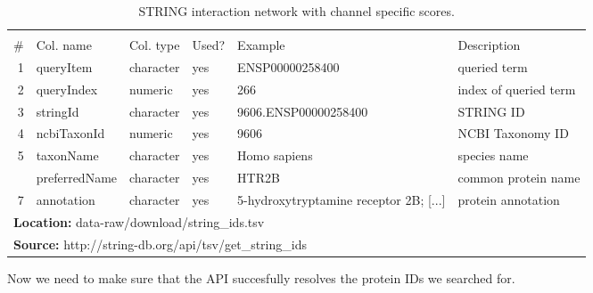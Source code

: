 \begin{table}[H]

\caption{\label{tab:string_ids}STRING interaction network with channel specific scores.}
\begin{tabular}[t]{rlllll}
\toprule
\multicolumn{6}{c}{\bgroup\fontsize{12}{14}\selectfont \cellcolor[HTML]{EEEEEE}{\ttfamily{\textbf{string\_ids}}}\egroup{}} \\
\cmidrule(l{3pt}r{3pt}){1-6}
\# & Col. name & Col. type & Used? & Example & Description\\
\midrule
\rowcolor{gray!6}  1 & queryItem & character & yes & ENSP00000258400 & queried term\\
2 & queryIndex & numeric & yes & 266 & index of queried term\\
\rowcolor{gray!6}  3 & stringId & character & yes & 9606.ENSP00000258400 & STRING ID\\
4 & ncbiTaxonId & numeric & yes & 9606 & NCBI Taxonomy ID\\
\rowcolor{gray!6}  5 & taxonName & character & yes & Homo sapiens & species name\\
\addlinespace
6 & preferredName & character & yes & HTR2B & common protein name\\
\rowcolor{gray!6}  7 & annotation & character & yes & 5-hydroxytryptamine receptor 2B; [...] & protein annotation\\
\bottomrule
\multicolumn{6}{l}{\textbf{Location: } data-raw/download/string\_ids.tsv}\\
\multicolumn{6}{l}{\textbf{Source: } http://string-db.org/api/tsv/get\_string\_ids}\\
\end{tabular}
\end{table}

Now we need to make sure that the API succesfully resolves the protein
IDs we searched for.

